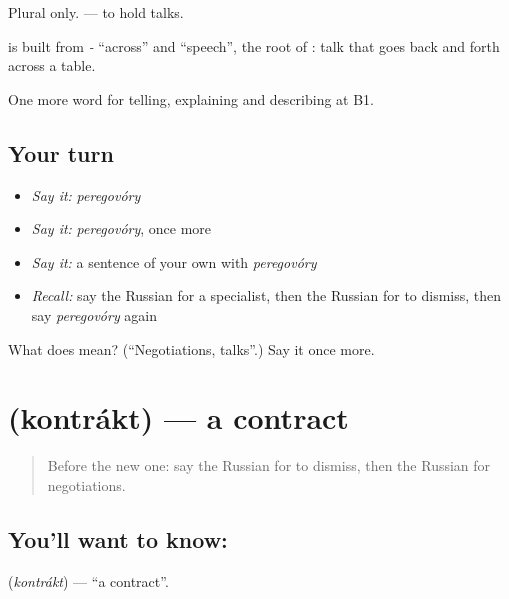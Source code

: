 Plural only. \emph{ } — to hold talks.

\begin{cousinweb}
\textbf{} is built from \emph{-} \textquotedblleft{}across\textquotedblright{} and \emph{} \textquotedblleft{}speech\textquotedblright{}, the root of \emph{}: talk that goes back and forth across a table.
\end{cousinweb}

\begin{grammarlens}[title={What you've built}]
One more word for telling, explaining and describing at B1.
\end{grammarlens}

\subsection*{Your turn}
\begin{itemize}
\raggedright
  \item \emph{Say it:} \emph{peregovóry}
  \item \emph{Say it:} \emph{peregovóry}, once more
  \item \emph{Say it:} a sentence of your own with \emph{peregovóry}
  \item \emph{Recall:} say the Russian for a specialist, then the Russian for to dismiss, then say \emph{peregovóry} again
\end{itemize}

\begin{tcolorbox}[breakable,colback=teal!4,colframe=teal!35!black,title={Before you move on}]
What does  mean? (\textquotedblleft{}Negotiations, talks\textquotedblright{}.) Say it once more.
\end{tcolorbox}
\section[\texorpdfstring{\ru{контракт} (kontrákt)}{контракт (kontrákt)}]{ (kontrákt) — a contract}

\label{lesson:RU-C363-kontrakt}



\begin{quote}
Before the new one: say the Russian for to dismiss, then the Russian for negotiations.
\end{quote}

\subsection*{You'll want to know: }
\textbf{} (\emph{kontrákt}) — \textquotedblleft{}a contract\textquotedblright{}.

